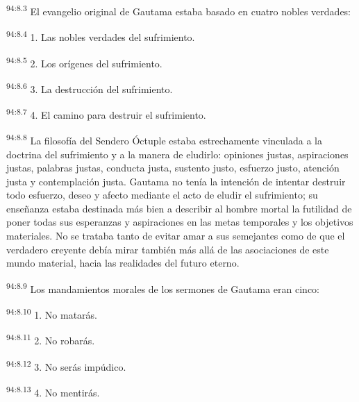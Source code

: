\par
\textsuperscript{94:8.3} El evangelio original de Gautama estaba basado en cuatro nobles verdades:

\par
\textsuperscript{94:8.4} 1. Las nobles verdades del sufrimiento.

\par
\textsuperscript{94:8.5} 2. Los orígenes del sufrimiento.

\par
\textsuperscript{94:8.6} 3. La destrucción del sufrimiento.

\par
\textsuperscript{94:8.7} 4. El camino para destruir el sufrimiento.

\par
\textsuperscript{94:8.8} La filosofía del Sendero Óctuple estaba estrechamente vinculada a la doctrina del sufrimiento y a la manera de eludirlo: opiniones justas, aspiraciones justas, palabras justas, conducta justa, sustento justo, esfuerzo justo, atención justa y contemplación justa. Gautama no tenía la intención de intentar destruir todo esfuerzo, deseo y afecto mediante el acto de eludir el sufrimiento; su enseñanza estaba destinada más bien a describir al hombre mortal la futilidad de poner todas sus esperanzas y aspiraciones en las metas temporales y los objetivos materiales. No se trataba tanto de evitar amar a sus semejantes como de que el verdadero creyente debía mirar también más allá de las asociaciones de este mundo material, hacia las realidades del futuro eterno.

\par
\textsuperscript{94:8.9} Los mandamientos morales de los sermones de Gautama eran cinco:

\par
\textsuperscript{94:8.10} 1. No matarás.

\par
\textsuperscript{94:8.11} 2. No robarás.

\par
\textsuperscript{94:8.12} 3. No serás impúdico.

\par
\textsuperscript{94:8.13} 4. No mentirás.


